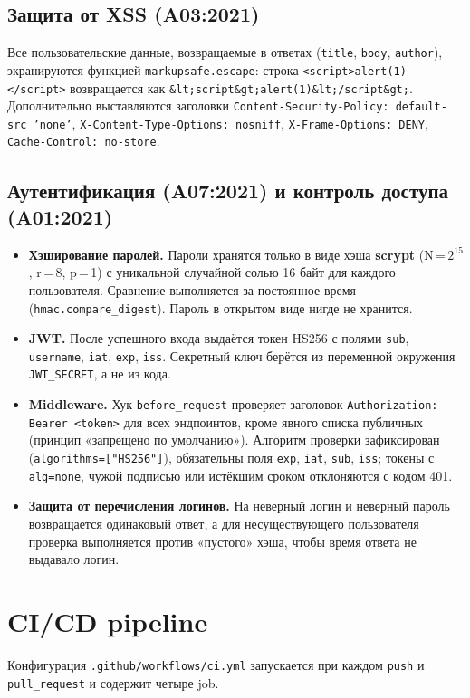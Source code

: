 \documentclass[12pt,a4paper]{article}
\newcommand{\code}[1]{\texttt{\small #1}}
\begin{document}
\subsection{Защита от XSS (A03:2021)}
Все пользовательские данные, возвращаемые в ответах (\code{title}, \code{body}, \code{author}), экранируются функцией
\code{markupsafe.escape}: строка \code{<script>alert(1)</script>} возвращается как \code{\&lt;script\&gt;alert(1)\&lt;/script\&gt;}.
Дополнительно выставляются заголовки \code{Content-Security-Policy: default-src 'none'}, \code{X-Content-Type-Options: nosniff},
\code{X-Frame-Options: DENY}, \code{Cache-Control: no-store}.

\subsection{Аутентификация (A07:2021) и контроль доступа (A01:2021)}
\begin{itemize}
  \item \textbf{Хэширование паролей.} Пароли хранятся только в виде хэша \textbf{scrypt} (N\,=\,$2^{15}$, r\,=\,8, p\,=\,1)
        с уникальной случайной солью 16 байт для каждого пользователя. Сравнение выполняется за постоянное время
        (\code{hmac.compare\_digest}). Пароль в открытом виде нигде не хранится.
  \item \textbf{JWT.} После успешного входа выдаётся токен HS256 с полями \code{sub}, \code{username}, \code{iat}, \code{exp},
        \code{iss}. Секретный ключ берётся из переменной окружения \code{JWT\_SECRET}, а не из кода.
  \item \textbf{Middleware.} Хук \code{before\_request} проверяет заголовок \code{Authorization: Bearer <token>} для всех
        эндпоинтов, кроме явного списка публичных (принцип «запрещено по умолчанию»). Алгоритм проверки зафиксирован
        (\code{algorithms=["HS256"]}), обязательны поля \code{exp}, \code{iat}, \code{sub}, \code{iss}; токены с \code{alg=none},
        чужой подписью или истёкшим сроком отклоняются с кодом 401.
  \item \textbf{Защита от перечисления логинов.} На неверный логин и неверный пароль возвращается одинаковый ответ, а для
        несуществующего пользователя проверка выполняется против «пустого» хэша, чтобы время ответа не выдавало логин.
\end{itemize}

\section{CI/CD pipeline}
Конфигурация \code{.github/workflows/ci.yml} запускается при каждом \code{push} и \code{pull\_request} и содержит четыре job.
\end{document}
